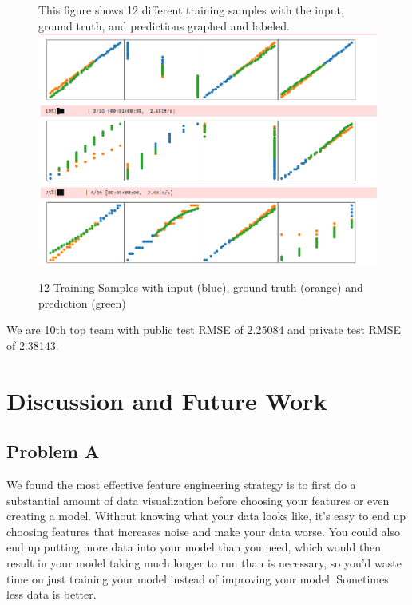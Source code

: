 \documentclass{article}
\begin{document}
\begin{figure}[H]
    \centering
    This figure shows 12 different training samples with the input, ground truth, and predictions graphed and labeled. 
    \includegraphics[scale=0.4]{sample.png}
    \caption{12 Training Samples with input (blue), ground truth (orange) and prediction (green)}
    \label{fig:galaxy}
\end{figure}


We are 10th top team with public test RMSE of 2.25084 and private test RMSE of 2.38143.

\section{Discussion and Future Work}
\subsection{Problem A}
We found the most effective feature engineering strategy is to first do a substantial amount of data visualization before choosing your features or even creating a model. Without knowing what your data looks like, it's easy to end up choosing features that increases noise and make your data worse. You could also end up putting more data into your model than you need, which would then result in your model taking much longer to run than is necessary, so you'd waste time on just training your model instead of improving your model. Sometimes less data is better. 
\end{document}
